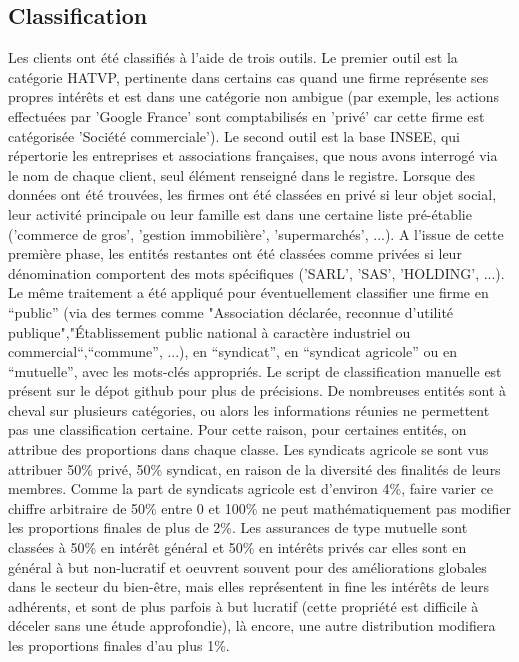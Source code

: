 \documentclass[a4paper,12pt]{article}
\begin{document}
\subsection{Classification}

Les clients ont été classifiés à l'aide de trois outils. Le premier outil est la catégorie HATVP, pertinente dans certains cas quand une firme représente ses propres intér\^ets et est dans une catégorie non ambigue (par exemple, les actions effectuées par 'Google France' sont comptabilisés en 'privé' car cette firme est catégorisée 'Société commerciale'). Le second outil est la base INSEE, qui répertorie les entreprises et associations fran\c caises, que nous avons interrogé via le nom de chaque client, seul élément renseigné dans le registre. 
 Lorsque des données ont été trouvées, les firmes ont été classées en privé si  leur objet social, leur activité principale ou leur famille est dans une certaine liste pré-établie ('commerce de gros', 'gestion immobilière', 'supermarchés', ...). A l'issue de cette première phase, les entités restantes ont été classées comme privées si leur dénomination comportent des mots spécifiques  ('SARL', 'SAS', 'HOLDING', ...). Le m\^eme traitement a été appliqué pour éventuellement classifier une firme en ``public'' (via des termes comme "Association déclarée, reconnue d'utilité publique","Établissement public national à caractère industriel ou commercial``,``commune'', ...), en ``syndicat'', en ``syndicat agricole'' ou en ``mutuelle'', avec les mots-clés appropriés. Le script de classification manuelle est présent sur le dépot github pour plus de précisions.
De nombreuses entités sont à cheval sur plusieurs catégories, ou alors les informations réunies ne permettent pas une classification certaine. Pour cette raison, pour certaines entités, on attribue des proportions dans chaque classe. 
Les syndicats agricole se sont vus attribuer 50\% privé, 50\% syndicat, en raison de la diversité des finalités de leurs membres. Comme la part de syndicats agricole est d'environ 4\%, faire varier ce chiffre arbitraire de 50\% entre 0 et 100\% ne peut mathématiquement pas modifier les proportions finales de plus de 2\%.
Les assurances de type mutuelle sont classées à 50\% en intérêt général et 50\% en intérêts privés car elles sont en général à but non-lucratif et oeuvrent souvent pour des améliorations globales dans le secteur du bien-être, mais elles représentent in fine les intérêts de leurs adhérents, et sont de plus parfois à but lucratif (cette propriété est difficile à déceler sans une étude approfondie), là encore, une autre distribution modifiera les proportions finales d'au plus 1\%. 
\end{document}
